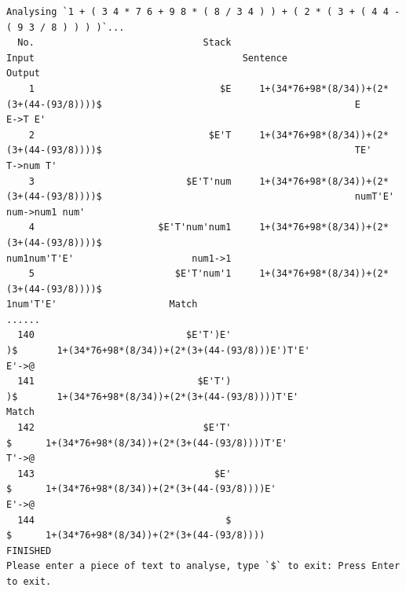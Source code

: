 \documentclass[UTF8]{ctexart}
\begin{document}
\begin{lstlisting}
Analysing `1 + ( 3 4 * 7 6 + 9 8 * ( 8 / 3 4 ) ) + ( 2 * ( 3 + ( 4 4 - ( 9 3 / 8 ) ) ) )`...
  No.                              Stack                                        Input                                     Sentence                   Output
    1                                 $E     1+(34*76+98*(8/34))+(2*(3+(44-(93/8))))$                                             E                        E->T E'
    2                               $E'T     1+(34*76+98*(8/34))+(2*(3+(44-(93/8))))$                                             TE'                        T->num T'
    3                           $E'T'num     1+(34*76+98*(8/34))+(2*(3+(44-(93/8))))$                                             numT'E'                      num->num1 num'
    4                      $E'T'num'num1     1+(34*76+98*(8/34))+(2*(3+(44-(93/8))))$                                             num1num'T'E'                     num1->1
    5                         $E'T'num'1     1+(34*76+98*(8/34))+(2*(3+(44-(93/8))))$                                             1num'T'E'                    Match
......
  140                           $E'T')E'                                           )$       1+(34*76+98*(8/34))+(2*(3+(44-(93/8)))E')T'E'                       E'->@
  141                             $E'T')                                           )$       1+(34*76+98*(8/34))+(2*(3+(44-(93/8))))T'E'                    Match
  142                              $E'T'                                            $      1+(34*76+98*(8/34))+(2*(3+(44-(93/8))))T'E'                       T'->@
  143                                $E'                                            $      1+(34*76+98*(8/34))+(2*(3+(44-(93/8))))E'                       E'->@
  144                                  $                                            $      1+(34*76+98*(8/34))+(2*(3+(44-(93/8))))                 FINISHED
Please enter a piece of text to analyse, type `$` to exit: Press Enter to exit.
    \end{lstlisting}
\end{document}
